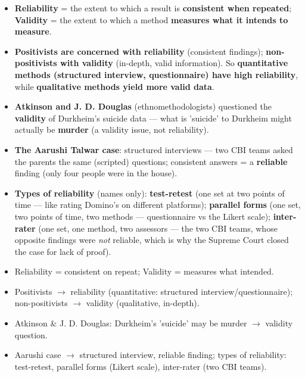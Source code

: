 \begin{KeyConcept}
\begin{itemize}
\item \textbf{Reliability} = the extent to which a result is \textbf{consistent when repeated}; \textbf{Validity} = the extent to which a method \textbf{measures what it intends to measure}.
\item \textbf{Positivists are concerned with reliability} (consistent findings); \textbf{non-positivists with validity} (in-depth, valid information). So \textbf{quantitative methods (structured interview, questionnaire) have high reliability}, while \textbf{qualitative methods yield more valid data}.
\item \textbf{Atkinson and J. D. Douglas} (ethnomethodologists) questioned the \textbf{validity} of Durkheim's suicide data --- what is 'suicide' to Durkheim might actually be \textbf{murder} (a validity issue, not reliability).
\item \textbf{The Aarushi Talwar case}: structured interviews --- two CBI teams asked the parents the same (scripted) questions; consistent answers = a \textbf{reliable} finding (only four people were in the house).
\item \textbf{Types of reliability} (names only): \textbf{test-retest} (one set at two points of time --- like rating Domino's on different platforms); \textbf{parallel forms} (one set, two points of time, two methods --- questionnaire vs the Likert scale); \textbf{inter-rater} (one set, one method, two assessors --- the two CBI teams, whose opposite findings were \emph{not} reliable, which is why the Supreme Court closed the case for lack of proof).
\end{itemize}
\end{KeyConcept}

\begin{QuickRevision}
\begin{itemize}
\item Reliability = consistent on repeat; Validity = measures what intended.
\item Positivists $\rightarrow$ reliability (quantitative: structured interview/questionnaire); non-positivists $\rightarrow$ validity (qualitative, in-depth).
\item Atkinson \& J. D. Douglas: Durkheim's 'suicide' may be murder $\rightarrow$ validity question.
\item Aarushi case $\rightarrow$ structured interview, reliable finding; types of reliability: test-retest, parallel forms (Likert scale), inter-rater (two CBI teams).
\end{itemize}
\end{QuickRevision}


